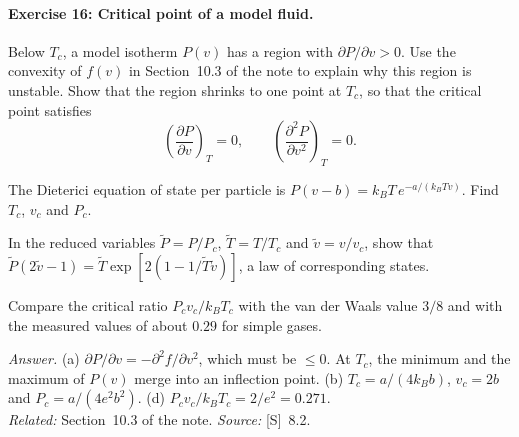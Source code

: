 \documentclass[11pt]{article}      %
\numberwithin{equation}{section}   %
\begin{document}
\paragraph{Exercise 16: Critical point of a model fluid.}
\begin{parts}
    \item Below $T_c$, a model isotherm $P(v)$ has a region with $\partial P/\partial v > 0$. Use the convexity of $f(v)$ in Section~10.3 of the note to explain why this region is unstable. Show that the region shrinks to one point at $T_c$, so that the critical point satisfies
    \begin{equation*}
        \left(\frac{\partial P}{\partial v}\right)_T = 0,
        \qquad
        \left(\frac{\partial^2P}{\partial v^2}\right)_T = 0.
    \end{equation*}
    \item The Dieterici equation of state per particle is $P(v - b) = k_BT\,e^{-a/(k_BTv)}$. Find $T_c$, $v_c$ and $P_c$.
    \item In the reduced variables $\tilde P = P/P_c$, $\tilde T = T/T_c$ and $\tilde v = v/v_c$, show that $\tilde P(2\tilde v - 1) = \tilde T\exp[2(1 - 1/\tilde T\tilde v)]$, a law of corresponding states.
    \item Compare the critical ratio $P_cv_c/k_BT_c$ with the van der Waals value $3/8$ and with the measured values of about $0.29$ for simple gases.
\end{parts}
\textit{Answer.} (a) $\partial P/\partial v = -\partial^2f/\partial v^2$, which must be $\le 0$. At $T_c$, the minimum and the maximum of $P(v)$ merge into an inflection point. (b) $T_c = a/(4k_Bb)$, $v_c = 2b$ and $P_c = a/(4e^2b^2)$. (d) $P_cv_c/k_BT_c = 2/e^2 = 0.271$.\\
\textit{Related:} Section~10.3 of the note. \textit{Source:} [S]~8.2.
\end{document}
